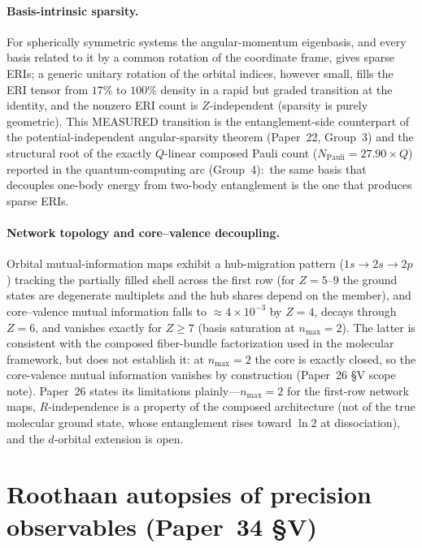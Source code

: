 \documentclass[aps,pra,twocolumn,superscriptaddress,longbibliography,nofootinbib]{revtex4-2}
\newcommand{\gvq}[2]{#2}
\begin{document}
\paragraph{Basis-intrinsic sparsity.}
For spherically symmetric systems the angular-momentum eigenbasis, and
every basis related to it by a common rotation of the coordinate frame,
gives sparse ERIs; a generic unitary rotation of the orbital indices,
however small, fills the ERI tensor from $17\%$ to $100\%$ density in a
rapid but graded transition at the identity, and the nonzero ERI count
is $Z$-independent (sparsity is purely geometric).  This MEASURED transition is the entanglement-side
counterpart of the potential-independent angular-sparsity theorem
(Paper~22, Group~3) and the structural root of the exactly $Q$-linear
composed Pauli count ($N_{\mathrm{Pauli}} = \gvq{composed_coeff}{27.90} \times Q$) reported
in the quantum-computing arc (Group~4):\ the same
basis that decouples one-body energy from two-body entanglement is the
one that produces sparse ERIs.

\paragraph{Network topology and core--valence decoupling.}
Orbital mutual-information maps exhibit a hub-migration pattern
($1s\to2s\to2p$) tracking the partially filled shell across the first
row (for $Z=5$--$9$ the ground states are degenerate multiplets and the
hub shares depend on the member), and core--valence mutual information falls to $\approx 4\times10^{-3}$
by $Z=4$, decays through $Z=6$, and vanishes exactly for $Z\geq7$ (basis saturation at $n_{\max}=2$).
The latter is consistent with the composed fiber-bundle factorization
used in the molecular framework, but does not establish it: at
$n_{\max}=2$ the core is exactly closed, so the core-valence mutual
information vanishes by construction (Paper~26 \S V scope note).  Paper~26 states its limitations
plainly---$n_{\max}=2$ for the first-row network maps, $R$-independence
is a property of the composed architecture (not of the true molecular
ground state, whose entanglement rises toward $\ln 2$ at dissociation), and the
$d$-orbital extension is open.

\section{Roothaan autopsies of precision observables (Paper~34 \S V)}
\end{document}

